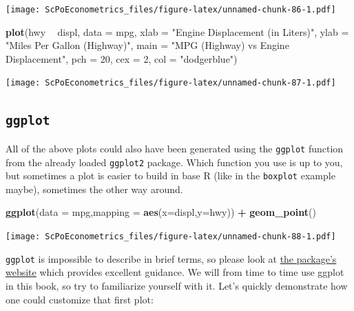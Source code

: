 \documentclass[]{book}
\newenvironment{Shaded}{\begin{snugshade}}{\end{snugshade}}
\newcommand{\KeywordTok}[1]{\textcolor[rgb]{0.13,0.29,0.53}{\textbf{#1}}}
\newcommand{\DataTypeTok}[1]{\textcolor[rgb]{0.13,0.29,0.53}{#1}}
\newcommand{\DecValTok}[1]{\textcolor[rgb]{0.00,0.00,0.81}{#1}}
\newcommand{\StringTok}[1]{\textcolor[rgb]{0.31,0.60,0.02}{#1}}
\newcommand{\OperatorTok}[1]{\textcolor[rgb]{0.81,0.36,0.00}{\textbf{#1}}}
\newcommand{\NormalTok}[1]{#1}
\theoremstyle{definition}
\theoremstyle{definition}
\theoremstyle{definition}
\theoremstyle{remark}
\begin{document}
\texttt{[image: ScPoEconometrics\_files/figure-latex/unnamed-chunk-86-1.pdf]}

\begin{Shaded}
\begin{Highlighting}[]
\KeywordTok{plot}\NormalTok{(hwy }\OperatorTok{~}\StringTok{ }\NormalTok{displ, }\DataTypeTok{data =}\NormalTok{ mpg,}
     \DataTypeTok{xlab =} \StringTok{"Engine Displacement (in Liters)"}\NormalTok{,}
     \DataTypeTok{ylab =} \StringTok{"Miles Per Gallon (Highway)"}\NormalTok{,}
     \DataTypeTok{main =} \StringTok{"MPG (Highway) vs Engine Displacement"}\NormalTok{,}
     \DataTypeTok{pch  =} \DecValTok{20}\NormalTok{,}
     \DataTypeTok{cex  =} \DecValTok{2}\NormalTok{,}
     \DataTypeTok{col  =} \StringTok{"dodgerblue"}\NormalTok{)}
\end{Highlighting}
\end{Shaded}

\texttt{[image: ScPoEconometrics\_files/figure-latex/unnamed-chunk-87-1.pdf]}

\subsection{\texorpdfstring{\texttt{ggplot}}{ggplot}}\label{ggplot}

All of the above plots could also have been generated using the
\texttt{ggplot} function from the already loaded \texttt{ggplot2}
package. Which function you use is up to you, but sometimes a plot is
easier to build in base R (like in the \texttt{boxplot} example maybe),
sometimes the other way around.

\begin{Shaded}
\begin{Highlighting}[]
\KeywordTok{ggplot}\NormalTok{(}\DataTypeTok{data =}\NormalTok{ mpg,}\DataTypeTok{mapping =} \KeywordTok{aes}\NormalTok{(}\DataTypeTok{x=}\NormalTok{displ,}\DataTypeTok{y=}\NormalTok{hwy)) }\OperatorTok{+}\StringTok{ }\KeywordTok{geom_point}\NormalTok{()}
\end{Highlighting}
\end{Shaded}

\texttt{[image: ScPoEconometrics\_files/figure-latex/unnamed-chunk-88-1.pdf]}

\texttt{ggplot} is impossible to describe in brief terms, so please look
at \href{http://ggplot2.tidyverse.org}{the package's website} which
provides excellent guidance. We will from time to time use ggplot in
this book, so try to familiarize yourself with it. Let's quickly
demonstrate how one could customize that first plot:
\end{document}
